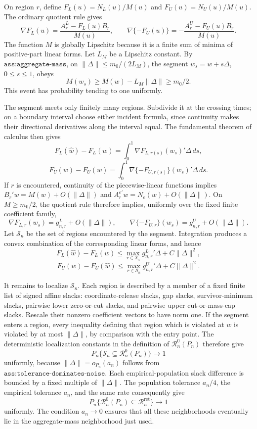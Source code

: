 On region \(r\), define \(F_L(u)=N_L(u)/M(u)\) and \(F_U(u)=N_U(u)/M(u)\). The ordinary quotient rule gives
\[
 \nabla F_L(u)=\frac{A_r^L-F_L(u)B_r}{M(u)},
 \qquad
 \nabla\{-F_U(u)\}=-\frac{A_r^U-F_U(u)B_r}{M(u)}.
\]
The function \(M\) is globally Lipschitz because it is a finite sum of minima of positive-part linear forms. Let \(L_M\) be a Lipschitz constant. By \(\texttt{ass:aggregate-mass}\), on
\(\lVert\Delta\rVert\le m_0/(2L_M)\), the segment \(w_s=w+s\Delta\), \(0\le s\le1\), obeys
\[
 M(w_s)\ge M(w)-L_M\lVert\Delta\rVert\ge m_0/2.
\]
This event has probability tending to one uniformly.

The segment meets only finitely many regions. Subdivide it at the crossing times; on a boundary interval choose either incident formula, since continuity makes their directional derivatives along the interval equal. The fundamental theorem of calculus then gives
\[
 F_L(\widehat w)-F_L(w)
 =\int_0^1\nabla F_{L,r(s)}(w_s)'\Delta\,ds,
\]
\[
 F_U(w)-F_U(\widehat w)
 =\int_0^1\nabla\{-F_{U,r(s)}\}(w_s)'\Delta\,ds.
\]
If \(r\) is encountered, continuity of the piecewise-linear functions implies
\(B_r'w=M(w)+O(\lVert\Delta\rVert)\) and
\(A_r^{e\prime}w=N_e(w)+O(\lVert\Delta\rVert)\). On \(M\ge m_0/2\), the quotient rule therefore implies, uniformly over the fixed finite coefficient family,
\[
 \nabla F_{L,r}(w_s)=g^L_{n,r}+O(\lVert\Delta\rVert),
 \qquad
 \nabla\{-F_{U,r}\}(w_s)=g^U_{n,r}+O(\lVert\Delta\rVert).
\]
Let \(\mathcal S_n\) be the set of regions encountered by the segment. Integration produces a convex combination of the corresponding linear forms, and hence
\[
 F_L(\widehat w)-F_L(w)
 \le\max_{r\in\mathcal S_n}g^L_{n,r}{}'\Delta+C\lVert\Delta\rVert^2,
\]
\[
 F_U(w)-F_U(\widehat w)
 \le\max_{r\in\mathcal S_n}g^U_{n,r}{}'\Delta+C\lVert\Delta\rVert^2.
\]

It remains to localize \(\mathcal S_n\). Each region is described by a member of a fixed finite list of signed affine slacks: coordinate-release slacks, gap slacks, survivor-minimum slacks, pairwise lower zero-or-cut slacks, and pairwise upper cut-or-mass-cap slacks. Rescale their nonzero coefficient vectors to have norm one. If the segment enters a region, every inequality defining that region which is violated at \(w\) is violated by at most \(\lVert\Delta\rVert\), by comparison with the entry point. The deterministic localization constants in the definition of \(\mathcal R_n^0(P_n)\) therefore give
\[
 P_n\{\mathcal S_n\subseteq\mathcal R_n^0(P_n)\}\longrightarrow1
\]
uniformly, because \(\lVert\Delta\rVert=o_{P_n}(a_n)\) follows from \(\texttt{ass:tolerance-dominates-noise}\). Each empirical-population slack difference is bounded by a fixed multiple of \(\lVert\Delta\rVert\). The population tolerance \(a_n/4\), the empirical tolerance \(a_n\), and the same rate consequently give
\[
 P_n\{\mathcal R_n^0(P_n)\subseteq\mathcal R_n^{\mathrm{ret}}\}
 \longrightarrow1
\]
uniformly. The condition \(a_n\to0\) ensures that all these neighborhoods eventually lie in the aggregate-mass neighborhood just used.

